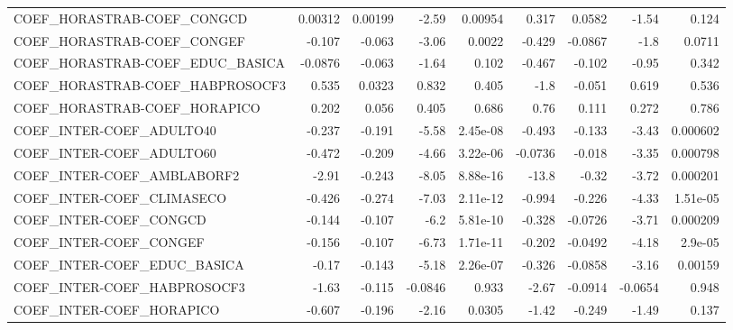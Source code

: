 \begin{tabular}{lrrrrrrrr}
COEF\_HORASTRAB-COEF\_CONGCD             &     0.00312 &      0.00199 &   -2.59 &  0.00954 &      0.317 &      0.0582 &        -1.54 &         0.124 \\
COEF\_HORASTRAB-COEF\_CONGEF             &      -0.107 &       -0.063 &   -3.06 &   0.0022 &     -0.429 &     -0.0867 &         -1.8 &        0.0711 \\
COEF\_HORASTRAB-COEF\_EDUC\_BASICA        &     -0.0876 &       -0.063 &   -1.64 &    0.102 &     -0.467 &      -0.102 &        -0.95 &         0.342 \\
COEF\_HORASTRAB-COEF\_HABPROSOCF3        &       0.535 &       0.0323 &   0.832 &    0.405 &       -1.8 &      -0.051 &        0.619 &         0.536 \\
COEF\_HORASTRAB-COEF\_HORAPICO           &       0.202 &        0.056 &   0.405 &    0.686 &       0.76 &       0.111 &        0.272 &         0.786 \\
COEF\_INTER-COEF\_ADULTO40               &      -0.237 &       -0.191 &   -5.58 & 2.45e-08 &     -0.493 &      -0.133 &        -3.43 &      0.000602 \\
COEF\_INTER-COEF\_ADULTO60               &      -0.472 &       -0.209 &   -4.66 & 3.22e-06 &    -0.0736 &      -0.018 &        -3.35 &      0.000798 \\
COEF\_INTER-COEF\_AMBLABORF2             &       -2.91 &       -0.243 &   -8.05 & 8.88e-16 &      -13.8 &       -0.32 &        -3.72 &      0.000201 \\
COEF\_INTER-COEF\_CLIMASECO              &      -0.426 &       -0.274 &   -7.03 & 2.11e-12 &     -0.994 &      -0.226 &        -4.33 &      1.51e-05 \\
COEF\_INTER-COEF\_CONGCD                 &      -0.144 &       -0.107 &    -6.2 & 5.81e-10 &     -0.328 &     -0.0726 &        -3.71 &      0.000209 \\
COEF\_INTER-COEF\_CONGEF                 &      -0.156 &       -0.107 &   -6.73 & 1.71e-11 &     -0.202 &     -0.0492 &        -4.18 &       2.9e-05 \\
COEF\_INTER-COEF\_EDUC\_BASICA            &       -0.17 &       -0.143 &   -5.18 & 2.26e-07 &     -0.326 &     -0.0858 &        -3.16 &       0.00159 \\
COEF\_INTER-COEF\_HABPROSOCF3            &       -1.63 &       -0.115 & -0.0846 &    0.933 &      -2.67 &     -0.0914 &      -0.0654 &         0.948 \\
COEF\_INTER-COEF\_HORAPICO               &      -0.607 &       -0.196 &   -2.16 &   0.0305 &      -1.42 &      -0.249 &        -1.49 &         0.137 \\

\end{tabular}
